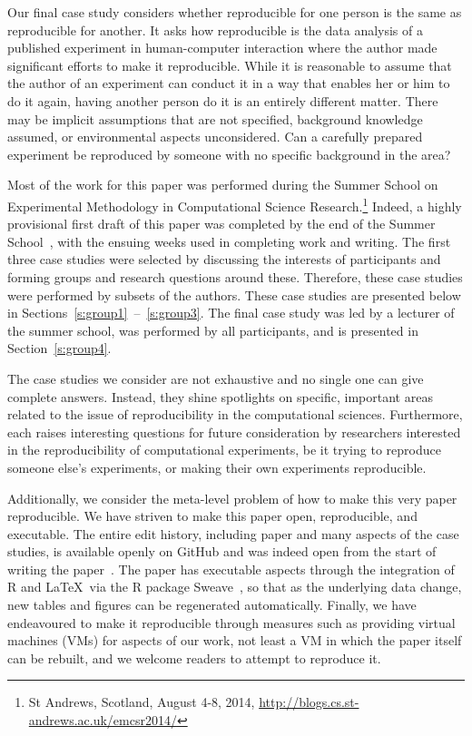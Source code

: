 Our final case study considers whether reproducible for one person is the same
as reproducible for another. It asks how reproducible is the data analysis of a
published experiment in human-computer interaction where the author made
significant efforts to make it reproducible. While it is reasonable to assume
that the author of an experiment can conduct it in a way that enables her or him
to do it again, having another person do it is an entirely different matter.
There may be implicit assumptions that are not specified, background knowledge
assumed, or environmental aspects unconsidered. Can a carefully prepared
experiment be reproduced by someone with no specific background in the area?

Most of the work for this paper was performed during the Summer School on
Experimental Methodology in Computational Science Research.\footnote{St
Andrews, Scotland, August 4-8, 2014,
\url{http://blogs.cs.st-andrews.ac.uk/emcsr2014/}}
Indeed, a highly
provisional first draft of this paper was completed by the end of the Summer
School~\cite{emcsr_arxiv_draft}, with the ensuing weeks used in completing work and writing.  
The first three case studies
were selected by discussing the interests of participants and forming groups
and research questions around these. Therefore, these case studies were
performed by subsets of the authors. These case studies are
presented below in Sections~\ref{s:group1}~--~\ref{s:group3}. The final case
study was led by a lecturer of the summer school, was performed by all
participants, and is presented in Section~\ref{s:group4}.

The case studies we consider are not exhaustive and no single one can give
complete answers. Instead, they shine spotlights on specific, important areas
related to the issue of reproducibility in the computational sciences. Furthermore,
each raises interesting questions for future consideration by researchers
interested in the reproducibility of computational experiments, be it trying to
reproduce someone else's experiments, or making their own experiments
reproducible.

Additionally, we consider the meta-level problem of how to make this very paper
reproducible. We have striven to make this paper open, reproducible, and
executable.
The entire edit history, including paper and many aspects of the
case studies, is available openly on
GitHub
and was indeed open from the start
of writing the paper~\cite{summerschoolpaper}.
The paper has executable aspects through the integration of R
and \LaTeX\ via the R package Sweave~\cite{lmucs-papers:Leisch:2002}, so that as the underlying
data change, new tables and figures can be regenerated automatically. Finally,
we have endeavoured to make it reproducible through measures such as providing
virtual machines (VMs) for aspects of our work, not least a VM in which
the paper itself can be rebuilt, and we welcome readers to attempt to
reproduce it.
